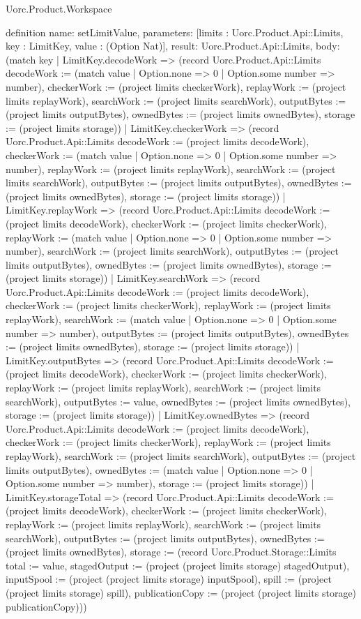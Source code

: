 \begin{lexlean}{Uorc.Product.Workspace}
\begin{semanticmodule}
definition{
  name: setLimitValue,
  parameters: [limits : Uorc.Product.Api::Limits, key : LimitKey, value : (Option Nat)],
  result: Uorc.Product.Api::Limits,
  body: (match key
    | LimitKey.decodeWork => (record Uorc.Product.Api::Limits {decodeWork := (match value
      | Option.none => 0
      | Option.some number => number), checkerWork := (project limits checkerWork), replayWork := (project limits replayWork), searchWork := (project limits searchWork), outputBytes := (project limits outputBytes), ownedBytes := (project limits ownedBytes), storage := (project limits storage)})
    | LimitKey.checkerWork => (record Uorc.Product.Api::Limits {decodeWork := (project limits decodeWork), checkerWork := (match value
      | Option.none => 0
      | Option.some number => number), replayWork := (project limits replayWork), searchWork := (project limits searchWork), outputBytes := (project limits outputBytes), ownedBytes := (project limits ownedBytes), storage := (project limits storage)})
    | LimitKey.replayWork => (record Uorc.Product.Api::Limits {decodeWork := (project limits decodeWork), checkerWork := (project limits checkerWork), replayWork := (match value
      | Option.none => 0
      | Option.some number => number), searchWork := (project limits searchWork), outputBytes := (project limits outputBytes), ownedBytes := (project limits ownedBytes), storage := (project limits storage)})
    | LimitKey.searchWork => (record Uorc.Product.Api::Limits {decodeWork := (project limits decodeWork), checkerWork := (project limits checkerWork), replayWork := (project limits replayWork), searchWork := (match value
      | Option.none => 0
      | Option.some number => number), outputBytes := (project limits outputBytes), ownedBytes := (project limits ownedBytes), storage := (project limits storage)})
    | LimitKey.outputBytes => (record Uorc.Product.Api::Limits {decodeWork := (project limits decodeWork), checkerWork := (project limits checkerWork), replayWork := (project limits replayWork), searchWork := (project limits searchWork), outputBytes := value, ownedBytes := (project limits ownedBytes), storage := (project limits storage)})
    | LimitKey.ownedBytes => (record Uorc.Product.Api::Limits {decodeWork := (project limits decodeWork), checkerWork := (project limits checkerWork), replayWork := (project limits replayWork), searchWork := (project limits searchWork), outputBytes := (project limits outputBytes), ownedBytes := (match value
      | Option.none => 0
      | Option.some number => number), storage := (project limits storage)})
    | LimitKey.storageTotal => (record Uorc.Product.Api::Limits {decodeWork := (project limits decodeWork), checkerWork := (project limits checkerWork), replayWork := (project limits replayWork), searchWork := (project limits searchWork), outputBytes := (project limits outputBytes), ownedBytes := (project limits ownedBytes), storage := (record Uorc.Product.Storage::Limits {total := value, stagedOutput := (project (project limits storage) stagedOutput), inputSpool := (project (project limits storage) inputSpool), spill := (project (project limits storage) spill), publicationCopy := (project (project limits storage) publicationCopy)})})
}
\end{semanticmodule}
\end{lexlean}
